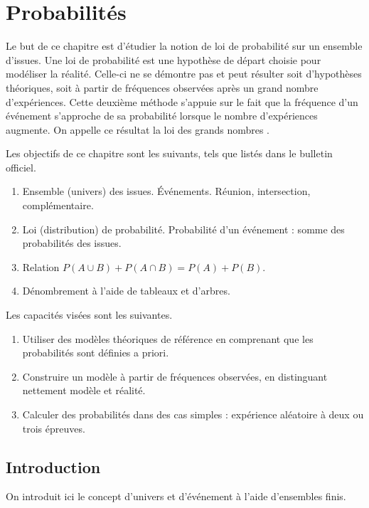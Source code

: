 \chapter{Probabilités}

Le but de ce chapitre est d'étudier la notion de loi de probabilité sur un ensemble d'issues.
Une loi de probabilité est une hypothèse de départ choisie pour modéliser la réalité.
Celle-ci ne se démontre pas et peut résulter soit d'hypothèses théoriques, soit à partir de fréquences observées après un grand nombre d'expériences.
Cette deuxième méthode s'appuie sur le fait que la fréquence d'un événement s'approche de sa probabilité lorsque le nombre d'expériences augmente.
On appelle ce résultat la \og loi des grands nombres \fg.

Les objectifs de ce chapitre sont les suivants, tels que listés dans le bulletin officiel.
	\begin{enumerate}
		\item Ensemble (univers) des issues. Événements. Réunion, intersection, complémentaire.
		\item Loi (distribution) de probabilité. Probabilité d'un événement : somme des probabilités des issues.
		\item Relation $P(A \cup B) + P(A \cap B) = P(A) + P(B)$.
		\item Dénombrement à l'aide de tableaux et d'arbres.
	\end{enumerate}
Les capacités visées sont les suivantes.
	\begin{enumerate}
		\item Utiliser des modèles théoriques de référence en comprenant que les probabilités sont définies a priori.
		\item Construire un modèle à partir de fréquences observées, en distinguant nettement modèle et réalité.
		\item Calculer des probabilités dans des cas simples : expérience aléatoire à deux ou trois épreuves.
	\end{enumerate}

\section{Introduction}

On introduit ici le concept d'univers et d'événement à l'aide d'ensembles finis.



